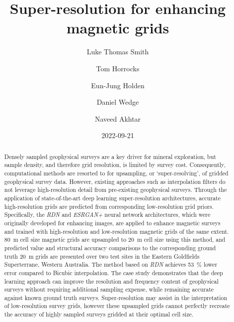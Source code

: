 % 
% 

\title{Super-resolution for enhancing magnetic grids}
\author[1*]{Luke Thomas Smith}
\author[1]{Tom Horrocks}
\author[1]{Eun-Jung Holden}
\author[1]{Daniel Wedge}
\author[2]{Naveed Akhtar}
\date{2022-09-21}

\bigskip
\begin{abstract}
    Densely sampled geophysical surveys are a key driver for mineral exploration, but sample density, and therefore grid resolution, is limited by survey cost.
    Consequently, computational methods are resorted to for upsampling, or `super-resolving', of gridded geophysical survey data.
    However, existing approaches such as interpolation filters do not leverage high-resolution detail from pre-existing geophysical surveys.
    Through the application of state-of-the-art deep learning super-resolution architectures, accurate high-resolution grids are predicted from corresponding low-resolution grid priors.
    Specifically, the \emph{RDN} and \emph{ESRGAN+} neural network architectures, which were originally developed for enhancing images, are applied to enhance magnetic surveys and trained with high-resolution and low-resolution magnetic grids of the same extent.
    \qty{80}{\metre} cell size magnetic grids are upsampled to \qty{20}{\metre} cell size using this method, and predicted value and structural accuracy comparisons to the corresponding ground truth \qty{20}{\metre} grids are presented over two test sites in the Eastern Goldfields Superterrane, Western Australia.
    The method based on \emph{RDN} achieves \qty{53}{\percent} lower error compared to Bicubic interpolation.
    The case study demonstrates that the deep learning approach can improve the resolution and frequency content of geophysical surveys without requiring additional sampling expense, while remaining accurate against known ground truth surveys.
    Super-resolution may assist in the interpretation of low-resolution survey grids, however these upsampled grids cannot perfectly recreate the accuracy of highly sampled surveys gridded at their optimal cell size.
\end{abstract}

